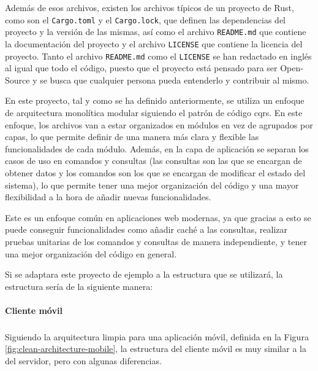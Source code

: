 Además de esos archivos, existen los archivos típicos de un proyecto de Rust, como son el \texttt{Cargo.toml} y el \texttt{Cargo.lock}, que definen las dependencias del proyecto y la versión de las mismas, así como el archivo \texttt{README.md} que contiene la documentación del proyecto y el archivo \texttt{LICENSE} que contiene la licencia del proyecto. Tanto el archivo \texttt{README.md} como el \texttt{LICENSE} se han redactado en inglés al igual que todo el código, puesto que el proyecto está pensado para ser Open-Source y se busca que cualquier persona pueda entenderlo y contribuir al mismo.

En este proyecto, tal y como se ha definido anteriormente, se utiliza un enfoque de arquitectura monolítica modular siguiendo el patrón de código \acrshort{cqrs}.
En este enfoque, los archivos van a estar organizados en módulos en vez de agrupados por capas, lo que permite definir de una manera más clara y flexible las funcionalidades de cada módulo.
Además, en la capa de aplicación se separan los casos de uso en comandos y consultas (las consultas son las que se encargan de obtener datos y los comandos son los que se encargan de modificar el estado del sistema), lo que permite tener una mejor organización del código y una mayor flexibilidad a la hora de añadir nuevas funcionalidades.

Este es un enfoque común en aplicaciones web modernas, ya que gracias a esto se puede conseguir funcionalidades como añadir caché a las consultas, realizar pruebas unitarias de los comandos y consultas de manera independiente, y tener una mejor organización del código en general.

Si se adaptara este proyecto de ejemplo a la estructura que se utilizará, la estructura sería de la siguiente manera:

\newpage
{}

\paragraph{Cliente móvil}
\subparagraph{}
Siguiendo la arquitectura limpia para una aplicación móvil, definida en la Figura \ref{fig:clean-architecture-mobile}, la estructura del cliente móvil es muy similar a la del servidor, pero con algunas diferencias.

